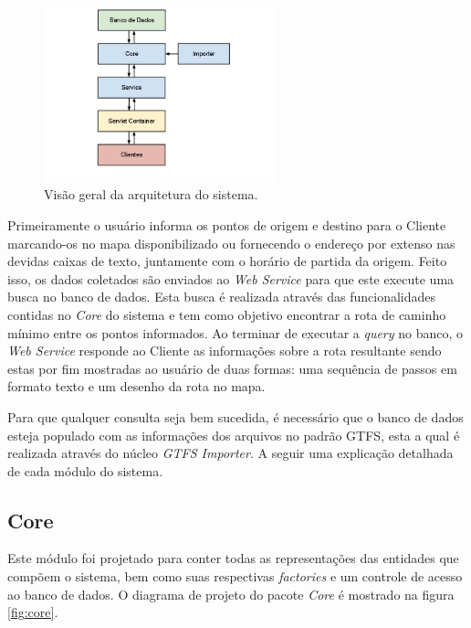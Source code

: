 \begin{figure}[!htb]
	\centering
	\includegraphics[width=0.6\textwidth]{./arquitetura.png}
	\caption[Arquitetura do sistema]{Visão geral da arquitetura do sistema.}
	\label{fig:arquitetura}
\end{figure}

Primeiramente o usuário informa os pontos de origem e destino para o Cliente marcando-os no mapa disponibilizado ou fornecendo o endereço por extenso nas devidas caixas de texto, juntamente com o horário de partida da origem.
Feito isso, os dados coletados são enviados ao \emph{Web Service} para que este execute uma busca no banco de dados. 
Esta busca é realizada através das funcionalidades contidas no \emph{Core} do sistema e tem como objetivo encontrar a rota de caminho mínimo entre os pontos informados.
Ao terminar de executar a \emph{query} no banco, o \emph{Web Service} responde ao Cliente as informações sobre a rota resultante sendo estas por fim mostradas ao usuário de duas formas: uma sequência de passos em formato texto e um desenho da rota no mapa.

Para que qualquer consulta seja bem sucedida, é necessário que o banco de dados esteja populado com as informações dos arquivos no padrão GTFS, esta a qual é realizada através do núcleo \emph{GTFS Importer}.
A seguir uma explicação detalhada de cada módulo do sistema.

\subsection{Core}
Este módulo foi projetado para conter todas as representações das entidades que compõem o sistema, bem como suas respectivas \emph{factories} e um controle de acesso ao banco de dados.
O diagrama de projeto do pacote \emph{Core} é mostrado na figura \ref{fig:core}.

